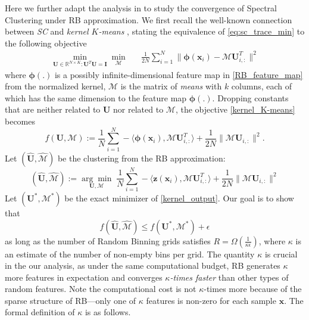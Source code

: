 \documentclass[sigconf]{acmart}
\newcommand{\1}{\boldsymbol{1}}
\newcommand{\bx}{\boldsymbol{x}}
\newcommand{\bz}{\boldsymbol{z}}
\newcommand{\bU}{\mathbf{U}}
\newcommand{\bI}{\mathbf{I}}
\newcommand{\cM}{\mathcal{M}}
\newcommand{\bUh}{\widehat{\bU}}
\newcommand{\cMh}{\widehat{\cM}}
\newcommand{\bphi}{\boldsymbol{\phi}}
\newcommand{\0}{\boldsymbol{0}}
\begin{document}
Here we further adapt the analysis in \cite{wu2016revisiting} to study the convergence of Spectral Clustering under RB approximation. We first recall the well-known connection between \emph{SC} and \emph{kernel $K$-means} \cite{dhillon2004kernel}, stating the equivalence of \eqref{eq:sc_trace_min} to the following objective
\begin{equation}\label{kernel_K-means}
\begin{aligned}
\min_{\bU \in \mathbb{R}^{N \times K}:\bU^T\bU=\bI}\min_{\cM} && \frac{1}{2N} \sum_{i=1}^N \|\bphi(\bx_i)-\cM \bU_{i,:}^T\|^2
\end{aligned}
\end{equation}
where $\bphi(.)$ is a possibly infinite-dimensional feature map in \eqref{RB_feature_map} from the normalized kernel, $\cM$ is the matrix of \emph{means} with $k$ columns, each of which has the same dimension to the feature map $\bphi(.)$. Dropping constants that are neither related to $\bU$ nor related to $\cM$, the objective \eqref{kernel_K-means} becomes
\begin{equation}\label{kernel_output}
f(\bU,\cM):=\frac{1}{N}\sum_{i=1}^N -\langle \bphi(\bx_i),\cM \bU_{i,:}^T\rangle + \frac{1}{2N}\|\cM\bU_{i,:}\|^2.
\end{equation}
Let $(\bUh,\cMh)$ be the clustering from the RB approximation:
\begin{equation}\label{alg_output}
(\bUh,\cMh):=\underset{\bU,\cM}{\arg \min}\;\frac{1}{N}\sum_{i=1}^N -\langle \bz(\bx_i),\cM \bU_{i,:}^T\rangle + \frac{1}{2N}\|\cM\bU_{i,:}\|^2
\end{equation}
Let $(\bU^*,\cM^*)$ be the exact minimizer of \eqref{kernel_output}. Our goal is to show that 
\begin{equation}\label{result}
f(\bUh,\cMh)\leq f(\bU^*,\cM^*) + \epsilon
\end{equation}
as long as the number of Random Binning grids satisfies $R=\Omega(\frac{1}{\kappa\epsilon})$, where $\kappa$ is an estimate of the number of non-empty bins per grid. The quantity $\kappa$ is crucial in the our analysis, as under the same computational budget, RB generates $\kappa$ more features in expectation and converges \emph{$\kappa$-times faster} than other types of random features. Note the computational cost is not $\kappa$-times more because of the sparse structure of RB---only one of $\kappa$ features is non-zero for each sample $\bx$. The formal definition of $\kappa$ is as follows.
\end{document}
